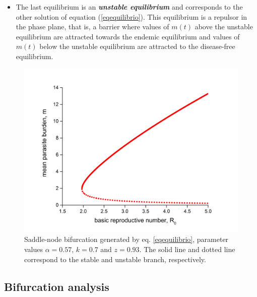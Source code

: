 \documentclass[eng]{MMSB-class-eng}
\begin{document}
{\begin{itemize}
	\item The last equilibrium is an \textit{\textbf{unstable equilibrium}} and corresponds to the other solution of equation (\ref{eqequilibrio}).
	This equilibrium is a repulsor in the phase plane, that is, a barrier where values of $m(t)$ above the unstable equilibrium are attracted towards the endemic equilibrium and values of $m(t)$ below the unstable equilibrium are attracted to the disease-free equilibrium.
\end{itemize}
\begin{figure}[h!]
	\centering
	\includegraphics[width=0.99\linewidth]{bifurcation}
	\caption{Saddle-node bifurcation generated by eq. \eqref{eqequilibrio}, parameter values $\alpha=0.57$, $k=0.7$ and $z=0.93$.
	The solid line and dotted line correspond to the stable and unstable branch, respectively.}
	\label{f:phase}
\end{figure}

}



\subsection{Bifurcation analysis}\label{bifurcacion}
\end{document}
